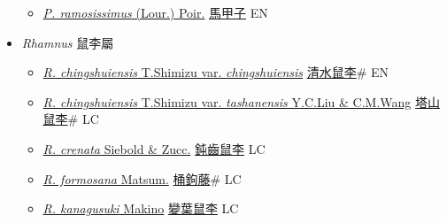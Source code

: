 \begin{itemize}
  \begin{itemize}
        \item[] \href{http://www.theplantlist.org/tpl1.1/search?q=Paliurus+ramosissimus}{\textit{P. ramosissimus} (Lour.) Poir.}   \href{\detokenize{http://taibnet.sinica.edu.tw/chi/taibnet_species_list.php?T2=馬甲子&T2_new_value=true&fr=y}}{馬甲子} EN
  \end{itemize}
 \item[] \textit{Rhamnus} 鼠李屬
                    
  \begin{itemize}
        \item[] \href{http://www.theplantlist.org/tpl1.1/search?q=Rhamnus+chingshuiensis+var.+chingshuiensis}{\textit{R. chingshuiensis} T.Shimizu var. \textit{chingshuiensis}}   \href{\detokenize{http://taibnet.sinica.edu.tw/chi/taibnet_species_list.php?T2=清水鼠李&T2_new_value=true&fr=y}}{清水鼠李}\# EN
        \item[] \href{http://www.theplantlist.org/tpl1.1/search?q=Rhamnus+chingshuiensis+var.+tashanensis}{\textit{R. chingshuiensis} T.Shimizu var. \textit{tashanensis} Y.C.Liu \& C.M.Wang}   \href{\detokenize{http://taibnet.sinica.edu.tw/chi/taibnet_species_list.php?T2=塔山鼠李&T2_new_value=true&fr=y}}{塔山鼠李}\# LC
        \item[] \href{http://www.theplantlist.org/tpl1.1/search?q=Rhamnus+crenata}{\textit{R. crenata} Siebold \& Zucc.}   \href{\detokenize{http://taibnet.sinica.edu.tw/chi/taibnet_species_list.php?T2=鈍齒鼠李&T2_new_value=true&fr=y}}{鈍齒鼠李} LC
        \item[] \href{http://www.theplantlist.org/tpl1.1/search?q=Rhamnus+formosana}{\textit{R. formosana} Matsum.}   \href{\detokenize{http://taibnet.sinica.edu.tw/chi/taibnet_species_list.php?T2=桶鉤藤&T2_new_value=true&fr=y}}{桶鉤藤}\# LC
        \item[] \href{http://www.theplantlist.org/tpl1.1/search?q=Rhamnus+kanagusuki}{\textit{R. kanagusuki} Makino}   \href{\detokenize{http://taibnet.sinica.edu.tw/chi/taibnet_species_list.php?T2=變葉鼠李&T2_new_value=true&fr=y}}{變葉鼠李} LC

\end{itemize}
\end{itemize}
